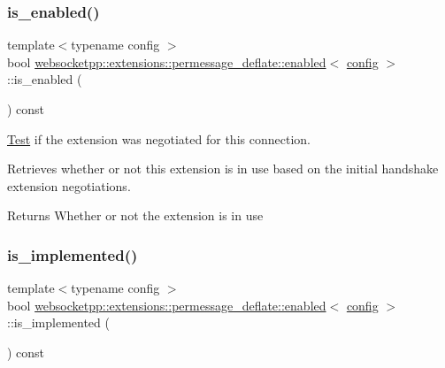 \subsubsection{\texorpdfstring{is\+\_\+enabled()}{is\_enabled()}}
{\footnotesize\ttfamily template$<$typename config $>$ \\
bool \mbox{\hyperlink{classwebsocketpp_1_1extensions_1_1permessage__deflate_1_1enabled}{websocketpp\+::extensions\+::permessage\+\_\+deflate\+::enabled}}$<$ \mbox{\hyperlink{classconfig}{config}} $>$\+::is\+\_\+enabled (\begin{DoxyParamCaption}{ }\end{DoxyParamCaption}) const\hspace{0.3cm}{\ttfamily [inline]}}



\mbox{\hyperlink{struct_test}{Test}} if the extension was negotiated for this connection. 

Retrieves whether or not this extension is in use based on the initial handshake extension negotiations.

\begin{DoxyReturn}{Returns}
Whether or not the extension is in use 
\end{DoxyReturn}
\mbox{\label{classwebsocketpp_1_1extensions_1_1permessage__deflate_1_1enabled_a76a196b1428865e739fe99e951f03e68}} 
\subsubsection{\texorpdfstring{is\+\_\+implemented()}{is\_implemented()}}
{\footnotesize\ttfamily template$<$typename config $>$ \\
bool \mbox{\hyperlink{classwebsocketpp_1_1extensions_1_1permessage__deflate_1_1enabled}{websocketpp\+::extensions\+::permessage\+\_\+deflate\+::enabled}}$<$ \mbox{\hyperlink{classconfig}{config}} $>$\+::is\+\_\+implemented (\begin{DoxyParamCaption}{ }\end{DoxyParamCaption}) const\hspace{0.3cm}{\ttfamily [inline]}}



